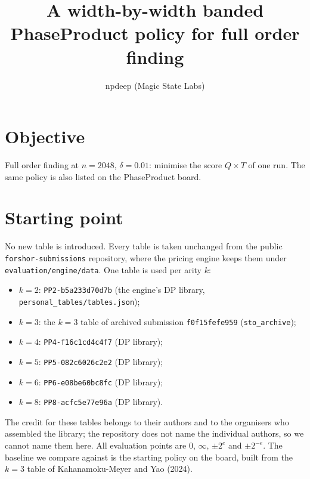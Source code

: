 \documentclass[11pt]{article}
\title{A width-by-width banded PhaseProduct policy for full order finding}
\author{npdeep (Magic State Labs)}
\date{}
\begin{document}
\maketitle

\section*{Objective}
Full order finding at $n = 2048$, $\delta = 0.01$: minimise the score $Q \times T$ of one run. The same policy is also listed on the PhaseProduct board.

\section*{Starting point}
No new table is introduced. Every table is taken unchanged from the public \texttt{forshor-submissions} repository, where the pricing engine keeps them under \texttt{evaluation/engine/data}. One table is used per arity $k$:
\begin{itemize}
  \item $k=2$: \texttt{PP2-b5a233d70d7b} (the engine's DP library, \texttt{personal\_tables/tables.json});
  \item $k=3$: the $k=3$ table of archived submission \texttt{f0f15fefe959} (\texttt{sto\_archive});
  \item $k=4$: \texttt{PP4-f16c1cd4c4f7} (DP library);
  \item $k=5$: \texttt{PP5-082c6026c2e2} (DP library);
  \item $k=6$: \texttt{PP6-e08be60bc8fc} (DP library);
  \item $k=8$: \texttt{PP8-acfc5e77e96a} (DP library).
\end{itemize}
The credit for these tables belongs to their authors and to the organisers who assembled the library; the repository does not name the individual authors, so we cannot name them here. All evaluation points are $0$, $\infty$, $\pm 2^e$ and $\pm 2^{-e}$. The baseline we compare against is the starting policy on the board, built from the $k=3$ table of Kahanamoku-Meyer and Yao (2024).
\end{document}
